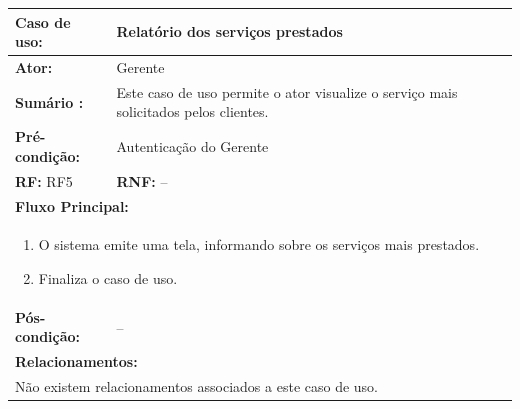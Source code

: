 \documentclass[
	12pt,				%
	openright,
	oneside,			%
	a4paper,			%
	chapter=TITLE,		%
	brazil				%
	]{abntex2}
\begin{document}
\begin{table}[h]
\centering
\begin{tabular}{|p{3cm}|p{3cm}|p{3cm}|p{3cm}|}
\hline
\textbf{Caso de uso:}             & \multicolumn{3}{p{9cm}|}{Relatório dos serviços prestados}				 \\ \hline
\textbf{Ator:}                 & \multicolumn{3}{p{9cm}|}{Gerente}         			          						 	\\ \hline
\textbf{Sumário :}                & \multicolumn{3}{p{9cm}|}{Este caso de uso permite o ator visualize %
													o serviço mais solicitados pelos clientes.}         	\\ \hline
\textbf{Pré-condição:}            & \multicolumn{3}{p{9cm}|}{ Autenticação do Gerente }                				    \\ \hline
\multicolumn{2}{|p{6cm}|}{\textbf{RF:} RF5 }                  & \multicolumn{2}{p{6cm}|}{\textbf{RNF:} --}     	    \\ \hline
\multicolumn{4}{|p{12cm}|}{\textbf{Fluxo Principal:}}                                                					\\ \hline
\multicolumn{4}{|p{12cm}|}{%
\begin{enumerate}
  \item O sistema emite uma tela, informando sobre os serviços mais prestados.
  \item Finaliza o caso de uso.
\end{enumerate}}                                                               				 							\\ \hline
\textbf{Pós-condição: }  & \multicolumn{3}{p{9cm}|}{ -- }		\\ \hline
\multicolumn{4}{|p{12cm}|}{\textbf{Relacionamentos:}}                                        								\\ \hline
\multicolumn{4}{|p{12cm}|}{Não existem relacionamentos associados a este caso de uso.}                                  \\ \hline
\end{tabular}
\end{table}
\end{document}

